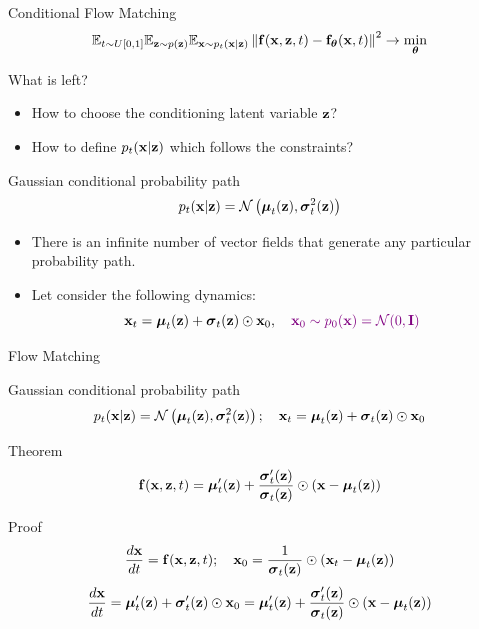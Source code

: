 \begin{frame}{Conditional Flow Matching}
	\vspace{-0.2cm}
	\[
		\mathbb{E}_{t \sim U[0, 1]} \mathbb{E}_{\mathbf{z} \sim p(\mathbf{z})} \mathbb{E}_{\mathbf{x} \sim p_t(\mathbf{x} | \mathbf{z})}\left\| \mathbf{f}(\mathbf{x}, \mathbf{z}, t) - \mathbf{f}_{\boldsymbol{\theta}}(\mathbf{x}, t) \right\|^2 \rightarrow \min_{\boldsymbol{\theta}}
	\]
	\vspace{-0.3cm}
	\begin{block}{What is left?}
		\begin{itemize}
			\item How to choose the conditioning latent variable $\mathbf{z}$?
			\item How to define $p_t(\mathbf{x} | \mathbf{z})$ which follows the constraints?
		\end{itemize}
	\end{block}
	\vspace{-0.3cm}
	\begin{block}{Gaussian conditional probability path}
		\vspace{-0.3cm}
		\[
			p_t(\mathbf{x} | \mathbf{z}) = \mathcal{N}\left(\boldsymbol{\mu}_t(\mathbf{z}), \boldsymbol{\sigma}_t^2(\mathbf{z})\right)
		\]
		\vspace{-0.5cm}
	\end{block}
	\begin{itemize}
		\item There is an infinite number of vector fields that generate any particular probability path.
		\item Let consider the following dynamics:
		\[
			\mathbf{x}_t = \boldsymbol{\mu}_t(\mathbf{z}) + \boldsymbol{\sigma}_t(\mathbf{z}) \odot \mathbf{x}_0, \quad {\color{violet} \mathbf{x}_0 \sim p_0(\mathbf{x}) = \mathcal{N}(0, \mathbf{I})}
		\]
	\end{itemize}
\end{frame}
\begin{frame}{Flow Matching}
	\begin{block}{Gaussian conditional probability path}
		\vspace{-0.3cm}
		\[
			p_t(\mathbf{x} | \mathbf{z}) = \mathcal{N}\left(\boldsymbol{\mu}_t(\mathbf{z}), \boldsymbol{\sigma}_t^2(\mathbf{z})\right); \quad \mathbf{x}_t = \boldsymbol{\mu}_t(\mathbf{z}) + \boldsymbol{\sigma}_t(\mathbf{z}) \odot \mathbf{x}_0
		\]
		\vspace{-0.5cm}
	\end{block}
	\begin{block}{Theorem}
		\vspace{-0.3cm}
		\[
			\mathbf{f}(\mathbf{x}, \mathbf{z}, t) =  \boldsymbol{\mu}_t'(\mathbf{z}) + \frac{\boldsymbol{\sigma}_t'(\mathbf{z})}{\boldsymbol{\sigma}_t(\mathbf{z})} \odot (\mathbf{x} - \boldsymbol{\mu}_t(\mathbf{z}))
		\]
		\vspace{-0.3cm}
	\end{block}
	\begin{block}{Proof}
	\vspace{-0.3cm}
	\[
		\frac{d\mathbf{x}}{dt} = \mathbf{f}(\mathbf{x}, \mathbf{z}, t); \quad \mathbf{x}_0 = \frac{1}{\boldsymbol{\sigma}_t(\mathbf{z})} \odot (\mathbf{x}_t - \boldsymbol{\mu}_t(\mathbf{z}))
	\]
	\[
		\frac{d\mathbf{x}}{dt} = \boldsymbol{\mu}_t'(\mathbf{z}) + \boldsymbol{\sigma}_t'(\mathbf{z}) \odot \mathbf{x}_0 =  \boldsymbol{\mu}_t'(\mathbf{z}) + \frac{\boldsymbol{\sigma}_t'(\mathbf{z})}{\boldsymbol{\sigma}_t(\mathbf{z})} \odot (\mathbf{x} - \boldsymbol{\mu}_t(\mathbf{z}))
	\]
	\end{block}
\end{frame}
